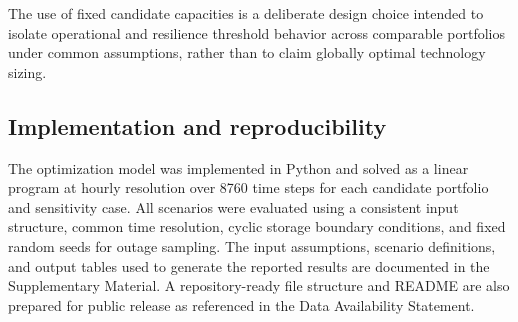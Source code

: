 \documentclass[preprint,12pt]{elsarticle}
\begin{document}
The use of fixed candidate capacities is a deliberate design choice intended to isolate operational and resilience threshold behavior across comparable portfolios under common assumptions, rather than to claim globally optimal technology sizing.

\subsection{Implementation and reproducibility}

The optimization model was implemented in Python and solved as a linear program at hourly resolution over 8760 time steps for each candidate portfolio and sensitivity case. All scenarios were evaluated using a consistent input structure, common time resolution, cyclic storage boundary conditions, and fixed random seeds for outage sampling. The input assumptions, scenario definitions, and output tables used to generate the reported results are documented in the Supplementary Material. A repository-ready file structure and README are also prepared for public release as referenced in the Data Availability Statement.
\end{document}
